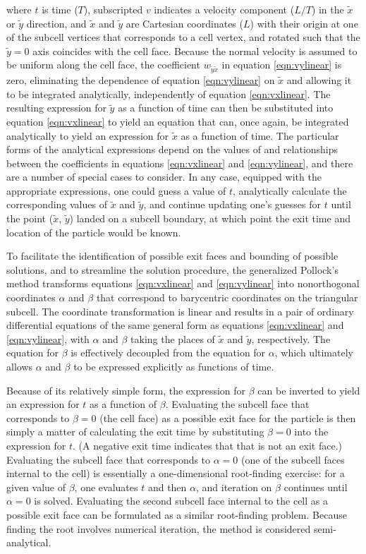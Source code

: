 \noindent where $t$ is time ($T$), subscripted $v$ indicates a velocity component ($L/T$) in the $\tilde{x}$ or $\tilde{y}$ direction, and $\tilde{x}$ and $\tilde{y}$ are Cartesian coordinates ($L$) with their origin at one of the subcell vertices that corresponds to a cell vertex, and rotated such that the $\tilde{y} = 0$ axis coincides with the cell face. Because the normal velocity is assumed to be uniform along the cell face, the coefficient $w_{\tilde{y} \tilde{x}}$ in equation \ref{eqn:vylinear} is zero, eliminating the dependence of equation \ref{eqn:vylinear} on $\tilde{x}$ and allowing it to be integrated analytically, independently of equation \ref{eqn:vxlinear}. The resulting expression for $\tilde{y}$ as a function of time can then be substituted into equation \ref{eqn:vxlinear} to yield an equation that can, once again, be integrated analytically to yield an expression for $\tilde{x}$ as a function of time. The particular forms of the analytical expressions depend on the values of and relationships between the coefficients in equations \ref{eqn:vxlinear} and \ref{eqn:vylinear}, and there are a number of special cases to consider. In any case, equipped with the appropriate expressions, one could guess a value of $t$, analytically calculate the corresponding values of $\tilde{x}$ and $\tilde{y}$, and continue updating one's guesses for $t$ until the point ($\tilde{x}$, $\tilde{y}$) landed on a subcell boundary, at which point the exit time and location of the particle would be known.

To facilitate the identification of possible exit faces and bounding of possible solutions, and to streamline the solution procedure, the generalized Pollock's method transforms equations \ref{eqn:vxlinear} and \ref{eqn:vylinear} into nonorthogonal coordinates $\alpha$ and $\beta$ that correspond to barycentric coordinates on the triangular subcell. The coordinate transformation is linear and results in a pair of ordinary differential equations of the same general form as equations \ref{eqn:vxlinear} and \ref{eqn:vylinear}, with $\alpha$ and $\beta$ taking the places of $\tilde{x}$ and $\tilde{y}$, respectively. The equation for $\beta$ is effectively decoupled from the equation for $\alpha$, which ultimately allows $\alpha$ and $\beta$ to be expressed explicitly as functions of time.

Because of its relatively simple form, the expression for $\beta$ can be inverted to yield an expression for $t$ as a function of $\beta$. Evaluating the subcell face that corresponds to $\beta = 0$ (the cell face) as a possible exit face for the particle is then simply a matter of calculating the exit time by substituting $\beta = 0$ into the expression for $t$. (A negative exit time indicates that that is not an exit face.) Evaluating the subcell face that corresponds to $\alpha = 0$ (one of the subcell faces internal to the cell) is essentially a one-dimensional root-finding exercise: for a given value of $\beta$, one evaluates $t$ and then $\alpha$, and iteration on $\beta$ continues until $\alpha = 0$ is solved. Evaluating the second subcell face internal to the cell as a possible exit face can be formulated as a similar root-finding problem. Because finding the root involves numerical iteration, the method is considered semi-analytical.

